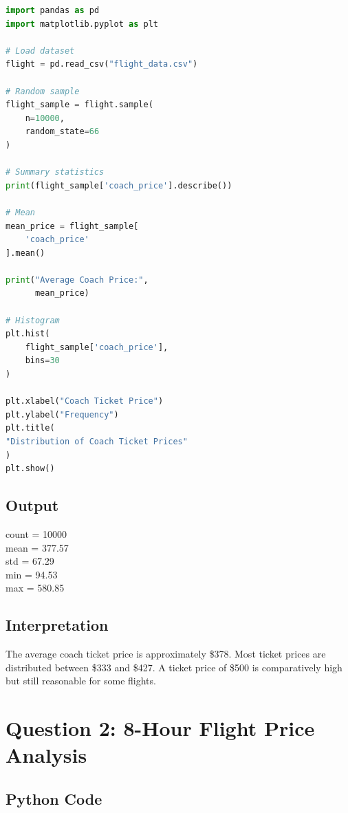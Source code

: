 \documentclass[12pt,a4paper]{article}
\begin{document}
\begin{lstlisting}[language=Python]
import pandas as pd
import matplotlib.pyplot as plt

# Load dataset
flight = pd.read_csv("flight_data.csv")

# Random sample
flight_sample = flight.sample(
    n=10000,
    random_state=66
)

# Summary statistics
print(flight_sample['coach_price'].describe())

# Mean
mean_price = flight_sample[
    'coach_price'
].mean()

print("Average Coach Price:",
      mean_price)

# Histogram
plt.hist(
    flight_sample['coach_price'],
    bins=30
)

plt.xlabel("Coach Ticket Price")
plt.ylabel("Frequency")
plt.title(
"Distribution of Coach Ticket Prices"
)
plt.show()
\end{lstlisting}

\subsection{Output}

\begin{tcolorbox}[colback=lightblue]
count = 10000 \\
mean = 377.57 \\
std = 67.29 \\
min = 94.53 \\
max = 580.85
\end{tcolorbox}

\subsection{Interpretation}

The average coach ticket price is approximately \$378. Most ticket prices are distributed between \$333 and \$427. A ticket price of \$500 is comparatively high but still reasonable for some flights.

\section{Question 2: 8-Hour Flight Price Analysis}

\subsection{Python Code}
\end{document}
